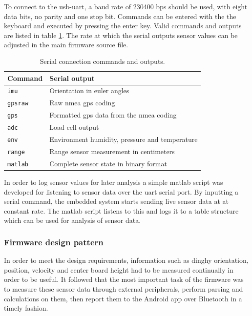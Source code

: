 To connect to the \gls{usb}-\gls{uart}, a baud rate of 230400 bps should be used, with eight data bits, no parity and one stop bit. Commands can be entered with the the keyboard and executed by pressing the enter key. Valid commands and outputs are listed in table \ref{table:serial}. The rate at which the serial outputs sensor values can be adjusted in the main firmware source file.

\begin{table}[H]
\centering
\begin{tabular}{ l | l }
  Command & Serial output \\
  \hline
  \texttt{imu} & Orientation in euler angles \\
  \texttt{gpsraw} & Raw \gls{nmea} \gls{gps} coding\\
  \texttt{gps} & Formatted \gls{gps} data from the \gls{nmea} coding\\
  \texttt{adc} & Load cell output\\
  \texttt{env} & Environment humidity, pressure and temperature \\
  \texttt{range} & Range sensor measurement in centimeters \\
  \texttt{matlab} & Complete sensor state in binary format \\
\end{tabular}
\caption{Serial connection commands and outputs.}
\label{table:serial}
\end{table}

In order to log sensor values for later analysis a simple \gls{matlab} script was developed for listening to sensor data over the \gls{uart} serial port. By inputting a serial command, the embedded system starts sending live sensor data at at constant rate. The \gls{matlab} script listens to this and logs it to a table structure which can be used for analysis of sensor data.


\subsubsection{Firmware design pattern}
In order to meet the design requirements, information such as dinghy orientation, position, velocity and center board height had to be measured continually in order to be useful. It followed that the most important task of the firmware was to measure these sensor data through external peripherals, perform parsing and calculations on them, then report them to the Android app over Bluetooth in a timely fashion. 

